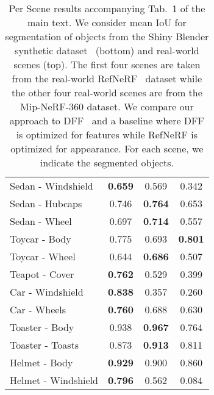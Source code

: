 \begin{table}[]
\begin{tabular}{lccc}
Sedan - Windshield                       & \textbf{0.659}                    & 0.569                   & 0.342                       \\
Sedan - Hubcaps                          & 0.746                    & \textbf{0.764}                   & 0.653                       \\
Sedan - Wheel                            & 0.697                    & \textbf{0.714}                   & 0.557                       \\
Toycar - Body                            & 0.775                    & 0.693                   & \textbf{0.801}                       \\
Toycar - Wheel                           & 0.644                    & \textbf{0.686}                   & 0.507                       \\
Teapot - Cover                           & \textbf{0.762}                    & 0.529                   & 0.399                       \\
\midrule
Car - Windshield & \textbf{0.838}                    & 0.357                   & 0.260                       \\
Car - Wheels     & \textbf{0.760}                    & 0.688                   & 0.630                       \\
Toaster - Body                           & 0.938                    & \textbf{0.967}                   & 0.764                       \\
Toaster - Toasts                         & 0.873                    & \textbf{0.913}                   & 0.811                       \\
Helmet - Body                            & \textbf{0.929}                    & 0.900                   & 0.860                       \\
Helmet - Windshield                      & \textbf{0.796}                    & 0.562                   & 0.084  \\                    
\bottomrule
\end{tabular}
    
\caption{Per Scene results accompanying Tab.~1 of the main text. We consider mean IoU for segmentation of objects from the Shiny Blender synthetic dataset~\cite{verbin2022refnerf} (bottom) and real-world scenes (top). The first four scenes are taken from the real-world RefNeRF~\cite{verbin2022refnerf} dataset while the other four real-world scenes are from the Mip-NeRF-360 dataset. We compare our approach to DFF~\cite{kobayashi2022decomposing} and a baseline where DFF is optimized for features while RefNeRF is optimized for appearance.
For each scene, we indicate the segmented objects. 
}
\label{tab:segmentation_iou_supp}
\vspace{-0.3cm}
\end{table}



